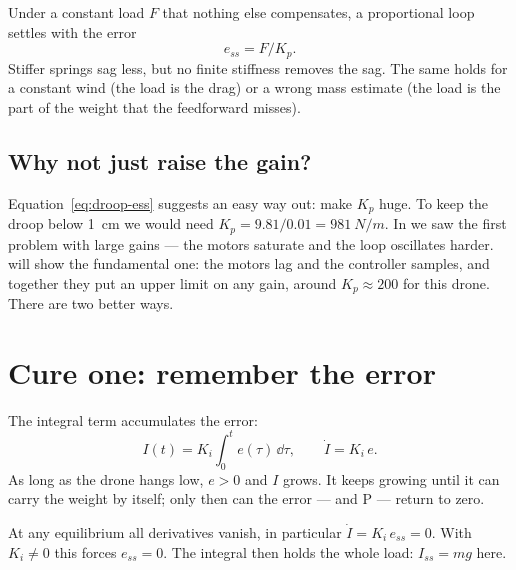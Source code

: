 \begin{keyidea}
Under a constant load $F$ that nothing else compensates, a proportional loop settles with the error
\begin{equation*}
  e_{ss} = F / K_p .
\end{equation*}
Stiffer springs sag less, but no finite stiffness removes the sag. The same holds for a constant wind (the load is the drag) or a wrong mass estimate (the load is the part of the weight that the feedforward misses).
\end{keyidea}

\subsection{Why not just raise the gain?}
Equation~\eqref{eq:droop-ess} suggests an easy way out: make $K_p$ huge. To keep the droop below \SI{1}{cm} we would need $K_p = 9.81/0.01 = \SI{981}{N/m}$. In  we saw the first problem with large gains — the motors saturate and the loop oscillates harder.  will show the fundamental one: the motors lag and the controller samples, and together they put an upper limit on any gain, around $K_p \approx 200$ for this drone. There are two better ways.

\section{Cure one: remember the error}

The integral term accumulates the error:
\begin{equation}
  I(t) = K_i\int_0^t e(\tau)\,\dd\tau ,\qquad \dot I = K_i\,e .
\end{equation}
As long as the drone hangs low, $e > 0$ and $I$ grows. It keeps growing until it can carry the weight by itself; only then can the error — and P — return to zero.

\begin{result}
At any equilibrium all derivatives vanish, in particular $\dot I = K_i\,e_{ss} = 0$. With $K_i \neq 0$ this forces $e_{ss} = 0$. The integral then holds the whole load: $I_{ss} = mg$ here.
\end{result}

